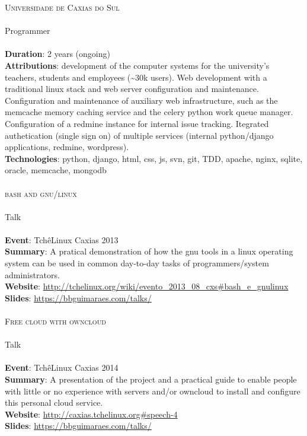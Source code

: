 \noindent
\textsc{\Large Universidade de Caxias do Sul} \\\\
Programmer \\\\
\textbf{Duration}: 2 years (ongoing) \\
\textbf{Attributions}:
    development of the computer systems for the university's teachers, students
    and employees (\textasciitilde{}30k users). Web development with a
    traditional linux stack and web server configuration and maintenance.
    Configuration and maintenance of auxiliary web infrastructure, such as the
    memcache memory caching service and the celery python work queue manager.
    Configuration of a redmine instance for internal issue tracking. Itegrated
    authetication (single sign on) of multiple services (internal python/django
    applications, redmine, wordpress). \\
\textbf{Technologies}:
    python, django, html, css, js, svn, git, TDD, apache, nginx, sqlite,
    oracle, memcache, mongodb \\\\

\noindent
\textsc{\Large bash and gnu/linux} \\\\
Talk \\\\
\textbf{Event}: TchêLinux Caxias  2013 \\
\textbf{Summary}:
    A pratical demonstration of how the gnu tools in a linux operating system
    can be used in common day-to-day tasks of programmers/system
    administrators. \\
\textbf{Website}:
    \url{http://tchelinux.org/wiki/evento_2013_08_cxs#bash_e_gnulinux} \\
\textbf{Slides}: \url{https://bbguimaraes.com/talks/} \\\\

\noindent
\textsc{\Large Free cloud with owncloud} \\\\
Talk \\\\
\textbf{Event}: TchêLinux Caxias 2014 \\
\textbf{Summary}:
    A presentation of the project and a practical guide to enable people
    with little or no experience with servers and/or owncloud to install and
    configure this personal cloud service. \\
\textbf{Website}: \url{http://caxias.tchelinux.org#speech-4} \\
\textbf{Slides}: \url{https://bbguimaraes.com/talks/} \\\\


